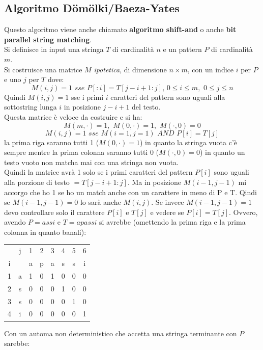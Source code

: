 \documentclass[a4paper,12pt, oneside]{book}
\begin{document}
\subsection{Algoritmo D\"om\"olki/Baeza-Yates}
Questo algoritmo viene anche chiamato \textbf{algoritmo shift-and} o
anche \textbf{bit parallel string matching}.\\
Si definisce in input una stringa $T$ di cardinalità $n$ e un pattern
$P$ di cardinalità $m$.\\
Si costruisce una matrice $M$ \textit{ipotetica}, di dimensione
$n\times m$, con un indice $i$ per $P$ e uno $j$ per $T$  dove:
\[M(i,j)=1\,\,sse\,\,P[:i]=T[j-i+1:j],\,0\leq i\leq m,\,\,0\leq j\leq
  n\]
Quindi $M(i,j)=1$ sse i primi $i$ caratteri del pattern sono uguali
alla sottostring lunga $i$ in posizione $j-i+1$ del testo.\\
Questa matrice è veloce da costruire e si ha:
\[M(m,\cdot) = 1,\,\, M(0,\cdot)=1,\,\, M(\cdot, 0)=0\]
\[M(i,j)=1\,\,sse\,\,M(i=1, j=1)\,\,AND\,\, P[i]=T[j]\]
la prima riga saranno tutti 1 ($ M(0,\cdot)=1$) in quanto la stringa
vuota c'è sempre mentre la prima colonna saranno tutti 0 ($M(\cdot,
0)=0$) in quanto un testo vuoto non matcha mai con una stringa non
vuota.\\
Quindi la matrice avrà 1 solo se i primi caratteri del pattern $P[i]$ sono
uguali alla porzione di testo $=T[j-i+1:j]$. Ma in posizione $M(i-1,
j-1)$ mi accorgo che ho 1 se ho un match anche con un carattere in
meno di P e T. Qindi se $M(i-1,j-1)=0$ lo sarà anche $M(i,j)$. Se
invece $M(i-1,j-1)=1$ devo controllare solo il carattere $P[i]$ e
$T[j]$ e vedere se $ P[i]=T[j]$.
Ovvero, avendo $P=assi$ e $T=apassi$ si avrebbe (omettendo la prima
riga e la prima colonna in quanto banali):
\begin{center}
  \begin{tabular}{c c | c c c c c c}
    & j & 1 & 2 & 3 & 4 & 5 & 6 \\
    i & & a & p & a & s & s & i \\
    \hline
    1 & a & 1 & 0 & 1 & 0 & 0 & 0\\
    2 & s & 0 & 0 & 0 & 1 & 0 & 0 \\
    3 & s & 0 & 0 & 0 & 0 & 1 & 0 \\
    4 & i & 0 & 0 & 0 & 0 & 0 & 1
  \end{tabular}
\end{center}
Con un automa non deterministico che accetta una stringa terminante
con $P$ sarebbe:
\begin{center}
\end{center}
\end{document}
